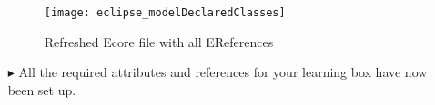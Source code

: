 \begin{itemize}
\vspace{1cm}

\begin{figure}[htbp]
	\centering
  \texttt{[image: eclipse\_modelDeclaredClasses]}
	\caption{Refreshed Ecore file with all EReferences}
	\label{eclipse:model_allClasses}
\end{figure}

\vspace{1cm}

\item[$\blacktriangleright$] All the required attributes and references for your learning box have now been set up.


\end{itemize}
